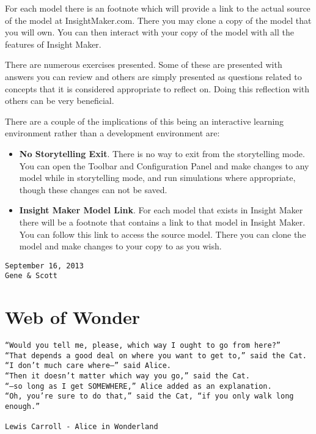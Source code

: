 \documentclass[]{memoir}
\begin{document}
For each model there is an footnote which will provide a link to the
actual source of the model at InsightMaker.com. There you may clone a
copy of the model that you will own. You can then interact with your
copy of the model with all the features of Insight Maker.

There are numerous exercises presented. Some of these are presented with
answers you can review and others are simply presented as questions
related to concepts that it is considered appropriate to reflect on.
Doing this reflection with others can be very beneficial.

There are a couple of the implications of this being an interactive
learning environment rather than a development environment are:

\begin{itemize}
\itemsep1pt\parskip0pt
\item
  \textbf{No Storytelling Exit}. There is no way to exit from the
  storytelling mode. You can open the Toolbar and Configuration Panel
  and make changes to any model while in storytelling mode, and run
  simulations where appropriate, though these changes can not be saved.
\item
  \textbf{Insight Maker Model Link}. For each model that exists in
  Insight Maker there will be a footnote that contains a link to that
  model in Insight Maker. You can follow this link to access the source
  model. There you can clone the model and make changes to your copy to
  as you wish.
\end{itemize}

\begin{lstlisting}
September 16, 2013
Gene & Scott
\end{lstlisting}

\chapter{Web of Wonder}

\begin{lstlisting}
“Would you tell me, please, which way I ought to go from here?”
“That depends a good deal on where you want to get to,” said the Cat.
“I don’t much care where–” said Alice.
“Then it doesn’t matter which way you go,” said the Cat.
“–so long as I get SOMEWHERE,” Alice added as an explanation.
“Oh, you’re sure to do that,” said the Cat, “if you only walk long enough.”

Lewis Carroll - Alice in Wonderland
\end{lstlisting}
\end{document}
